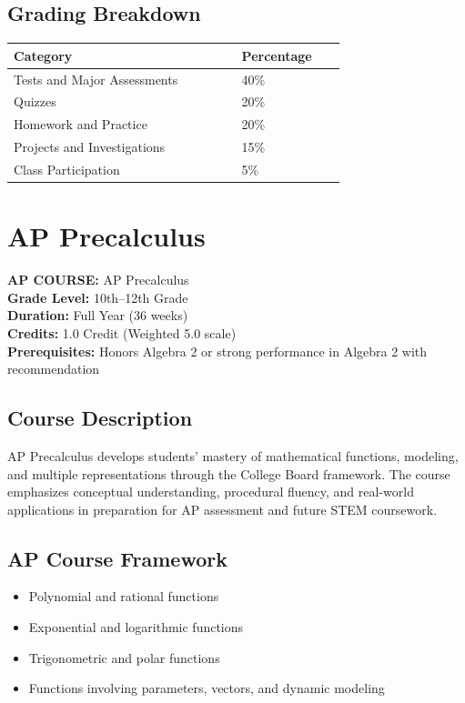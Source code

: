\documentclass[12pt,oneside]{book}
\begin{document}
\section{Grading Breakdown}
\begin{center}
\begin{tabular}{L{0.55\linewidth}L{0.25\linewidth}}
\toprule
\textbf{Category} & \textbf{Percentage} \\
\midrule
Tests and Major Assessments & 40\% \\
Quizzes & 20\% \\
Homework and Practice & 20\% \\
Projects and Investigations & 15\% \\
Class Participation & 5\% \\
\bottomrule
\end{tabular}
\end{center}

\chapter{AP Precalculus}

\noindent\textbf{AP COURSE:} AP Precalculus\\
\textbf{Grade Level:} 10th--12th Grade\\
\textbf{Duration:} Full Year (36 weeks)\\
\textbf{Credits:} 1.0 Credit (Weighted 5.0 scale)\\
\textbf{Prerequisites:} Honors Algebra 2 or strong performance in Algebra 2 with recommendation

\section{Course Description}
AP Precalculus develops students' mastery of mathematical functions, modeling, and multiple representations
through the College Board framework. The course emphasizes conceptual understanding, procedural fluency,
and real-world applications in preparation for AP assessment and future STEM coursework.

\section{AP Course Framework}
\begin{itemize}[leftmargin=2em]
    \item Polynomial and rational functions
    \item Exponential and logarithmic functions
    \item Trigonometric and polar functions
    \item Functions involving parameters, vectors, and dynamic modeling
\end{itemize}
\end{document}

